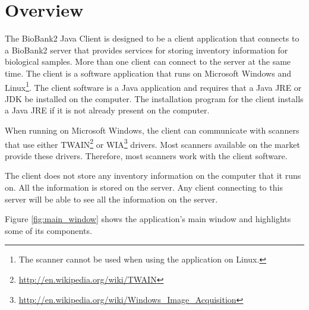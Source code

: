 \chapter{Overview}
The BioBank2 Java Client is designed to be a client application that connects
to a BioBank2 server that provides services for storing inventory information
for biological samples. More than one client can connect to the server at the
same time. The client is a software application that runs on Microsoft Windows
and Linux\footnote{The scanner cannot be used when using the application on
  Linux.}. The client software is a Java application and requires that a Java
JRE or JDK be installed on the computer. The installation program for the
client installs a Java JRE if it is not already present on the computer.

When running on Microsoft Windows, the client can communicate with scanners
that use either TWAIN\footnote{\url{http://en.wikipedia.org/wiki/TWAIN}} or
WIA\footnote{\url{http://en.wikipedia.org/wiki/Windows_Image_Acquisition}}
drivers. Most scanners available on the market provide these
drivers. Therefore, most scanners work with the client software.

The client does not store any inventory information on the computer that it
runs on. All the information is stored on the server. Any client connecting to
this server will be able to see all the information on the server.

Figure \ref{fig:main_window} shows the application's main window and highlights
some of its components.

